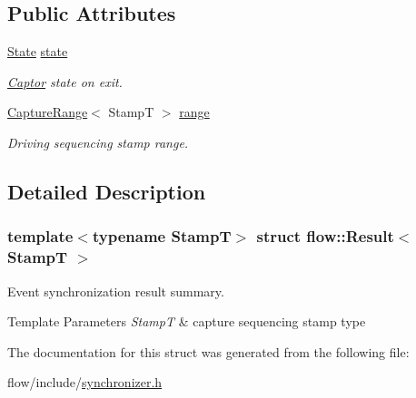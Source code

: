 \subsection*{Public Attributes}
\begin{DoxyCompactItemize}
\item 
\mbox{\label{structflow_1_1_result_a8316370b0ef770d217d27ebf9aa9653f}} 
\hyperlink{namespaceflow_adefe9726e597eb50c46f0f6a202018e9}{State} \hyperlink{structflow_1_1_result_a8316370b0ef770d217d27ebf9aa9653f}{state}
\begin{DoxyCompactList}\small\item\em \hyperlink{classflow_1_1_captor}{Captor} state on exit. \end{DoxyCompactList}\item 
\mbox{\label{structflow_1_1_result_a61d6fe7cbc7635f49831835ff36c5a11}} 
\hyperlink{structflow_1_1_capture_range}{Capture\+Range}$<$ StampT $>$ \hyperlink{structflow_1_1_result_a61d6fe7cbc7635f49831835ff36c5a11}{range}
\begin{DoxyCompactList}\small\item\em Driving sequencing stamp range. \end{DoxyCompactList}\end{DoxyCompactItemize}


\subsection{Detailed Description}
\subsubsection*{template$<$typename StampT$>$\newline
struct flow\+::\+Result$<$ Stamp\+T $>$}

Event synchronization result summary. 


\begin{DoxyTemplParams}{Template Parameters}
{\em StampT} & capture sequencing stamp type \\
\hline
\end{DoxyTemplParams}


The documentation for this struct was generated from the following file\+:\begin{DoxyCompactItemize}
\item 
flow/include/\hyperlink{synchronizer_8h}{synchronizer.\+h}\end{DoxyCompactItemize}
